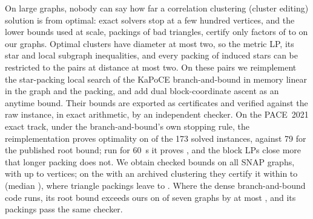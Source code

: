 On large graphs, nobody can say how far a correlation clustering (cluster
editing) solution is from optimal: exact solvers stop at a few hundred
vertices, and the lower bounds used at scale, packings of bad triangles,
certify only factors of \numBaseFacLo{} to \numBaseFacHi{} on our graphs.
Optimal clusters have diameter at most two, so the metric LP, its star and
local subgraph inequalities, and every packing of induced stars can be
restricted to the pairs at distance at most two.  On these pairs we
reimplement the star-packing local search of the KaPoCE branch-and-bound
in memory linear in the graph and the packing, and add dual
block-coordinate ascent as an anytime bound.  Their bounds are exported
as certificates and verified against the raw instance, in exact arithmetic,
by an independent checker.  On the PACE~2021 exact track, under the
branch-and-bound's own stopping rule, the reimplementation proves optimality
on \numPaceKrOpt{} of the 173 solved instances, against 79 for the published
root bound; run for \SI{60}{s} it proves \numPaceSlsOpt{}, and the block LPs
close \numPaceCfOnlyKept{} more that longer packing does not.  We obtain
checked bounds on all \numSnapTotal{} SNAP graphs, with up to
\numMaxCertN{} vertices; on the \numSnapGapN{} with an archived clustering
they certify it within \numSnapGapLo{} to \numSnapGapHi{} (median
\numSnapGapMedian{}), where triangle packings leave \numBaseGapLo{} to
\numBaseGapHi{}.  Where the dense branch-and-bound code runs, its root bound
exceeds ours on \numRootBetter{} of seven graphs by at most
\numRootBetterHi{}, and its packings pass the same checker.
